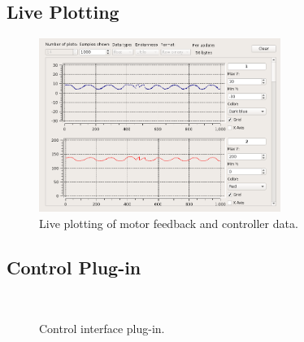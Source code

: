 \subsection{Live Plotting}

\begin{figure}
\centering
\includegraphics[width=0.7\textwidth]{images/gui/plotting}
\caption{Live plotting of motor feedback and controller data.}
\label{fig:live-plotting}
\end{figure}

\subsection{Control Plug-in}

\begin{figure}
\centering
{}
~
\caption{Control interface plug-in.}
\label{fig:Control interface plug-in} 
\end{figure}